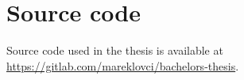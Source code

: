 \chapter{Source code}\label{ch:source-code}

Source code used in the thesis is available at \url{https://gitlab.com/mareklovci/bachelors-thesis}.
